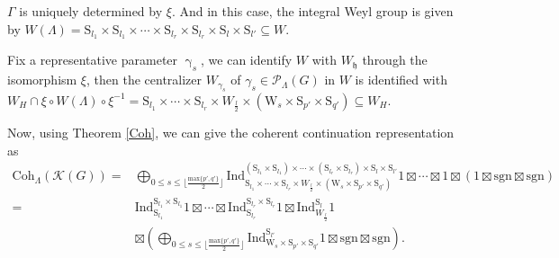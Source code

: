 \documentclass[12pt, a4paper]{amsart}
\numberwithin{equation}{section}
\newcommand{\CK}{{\mathcal {K}}}
\newcommand{\CP}{{\mathcal {P}}}
\newcommand{\fh}{\mathfrak{h}}
\newcommand{\Ind}{{\mathrm{Ind}}}
\newcommand{\sgn}{{\mathrm{sgn}}}
\begin{document}
$\Gamma$ is uniquely determined by $\xi$. And in this case, the integral Weyl group is given by $W(\Lambda) =  \mathrm{S}_{l_1} \times \mathrm{S}_{l_1} \times \cdots \times \mathrm{S}_{l_r} \times \mathrm{S}_{l_r} \times \mathrm{S}_{l} \times \mathrm{S}_{l'} \subseteq W$.

Fix a representative parameter $\upgamma_s$, we can identify $W$ with $W_{\fh}$ through the isomorphism $\xi$, then the centralizer $W_{{\gamma_{s}}}$ of ${\gamma_{s}} \in \CP_{\Lambda}(G)$ in $W$ is identified with $W_{H} \cap \xi \circ W(\Lambda) \circ \xi^{-1} = \mathrm{S}_{l_1} \times \cdots \times \mathrm{S}_{l_r} \times W_{\frac{l}{2}} \times (\mathrm{W}_{s} \times \mathrm{S}_{p'} \times \mathrm{S}_{q'}) \subseteq W_{H}$.

Now, using Theorem \ref{Coh}, we can give the coherent continuation representation as
\begin{align*}
    \mathrm{Coh}_{\Lambda}(\CK(G))  = &\bigoplus_{0 \leq s \leq \lfloor\frac{\mathrm{max}\{p',q'\}}{2}\rfloor} \Ind _{\mathrm{S}_{l_1} \times \cdots \times \mathrm{S}_{l_r} \times W_{\frac{l}{2}} \times (\mathrm{W}_{s} \times \mathrm{S}_{p'} \times \mathrm{S}_{q'})}^{(\mathrm{S}_{l_1} \times \mathrm{S}_{l_1}) \times \cdots \times (\mathrm{S}_{l_r} \times \mathrm{S}_{l_r}) \times \mathrm{S}_{l} \times \mathrm{S}_{l'}} 1 \boxtimes \cdots \boxtimes 1 \boxtimes (1 \boxtimes \sgn \boxtimes \sgn) \\
    = &\Ind_{\mathrm{S}_{l_1}}^{\mathrm{S}_{l_1}\times \mathrm{S}_{l_1}}1 \boxtimes \cdots \boxtimes \Ind_{\mathrm{S}_{l_r}}^{\mathrm{S}_{l_r}\times \mathrm{S}_{l_r}}1 \boxtimes \Ind_{W_{\frac{l}{2}}}^{\mathrm{S}_{l}} 1\\
    & \boxtimes (\bigoplus_{0 \leq s \leq \lfloor\frac{\mathrm{max}\{p',q'\}}{2}\rfloor}\Ind _{\mathrm{W}_{s} \times \mathrm{S}_{p'} \times \mathrm{S}_{q'}}^{\mathrm{S}_{l'}}1 \boxtimes \sgn \boxtimes \sgn ).
\end{align*}
\end{document}
